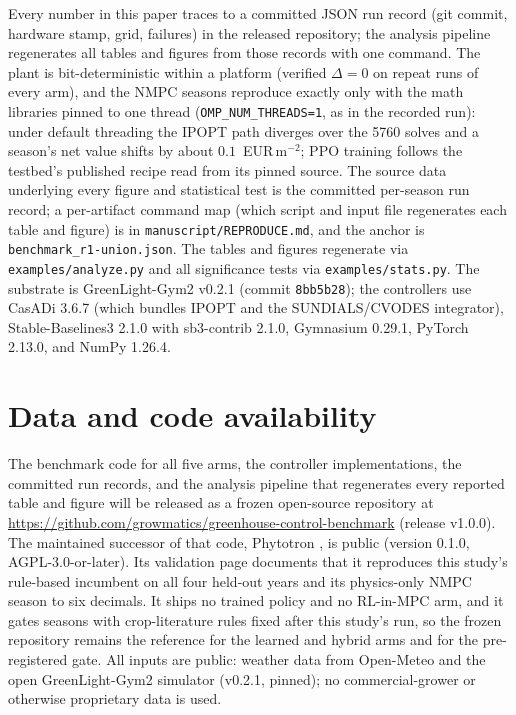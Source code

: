 \documentclass[11pt]{article}
\begin{document}
Every number in this paper traces to a committed JSON run record (git commit, hardware stamp, grid, failures) in the released repository; the analysis pipeline regenerates all tables and figures from those records with one command. The plant is bit-deterministic within a platform (verified $\Delta = 0$ on repeat runs of every arm), and the NMPC seasons reproduce exactly only with the math libraries pinned to one thread (\texttt{OMP\_NUM\_THREADS=1}, as in the recorded run): under default threading the IPOPT path diverges over the 5760 solves and a season's net value shifts by about $0.1$~EUR\,m$^{-2}$; PPO training follows the testbed's published recipe read from its pinned source. The
source data underlying every figure and statistical test is the committed per-season run
record; a per-artifact command map (which script and input file regenerates each table and figure) is in \texttt{manuscript/REPRODUCE.md}, and the anchor is \texttt{benchmark\_r1-union.json}. The tables and figures regenerate via \texttt{examples/analyze.py} and
all significance tests via \texttt{examples/stats.py}. The substrate is GreenLight-Gym2 v0.2.1 (commit \texttt{8bb5b28}); the controllers use CasADi 3.6.7 (which bundles IPOPT and the SUNDIALS/CVODES integrator), Stable-Baselines3 2.1.0 with sb3-contrib 2.1.0, Gymnasium 0.29.1, PyTorch 2.13.0, and NumPy 1.26.4.

\section*{Data and code availability}

The benchmark code for all five arms, the controller implementations, the committed run records, and the analysis pipeline that regenerates every reported table and figure will be released as a frozen open-source repository at \url{https://github.com/growmatics/greenhouse-control-benchmark} (release v1.0.0). The maintained successor of that code, Phytotron \citep{phytotron2026}, is public (version 0.1.0, AGPL-3.0-or-later). Its validation page documents that it reproduces this study's rule-based incumbent on all four held-out years and its physics-only NMPC season to six decimals. It ships no trained policy and no RL-in-MPC arm, and it gates seasons with crop-literature rules fixed after this study's run, so the frozen repository remains the reference for the learned and hybrid arms and for the pre-registered gate. All inputs are public: weather data from Open-Meteo and the open GreenLight-Gym2 simulator (v0.2.1, pinned); no commercial-grower or otherwise proprietary data is used.



\end{document}

